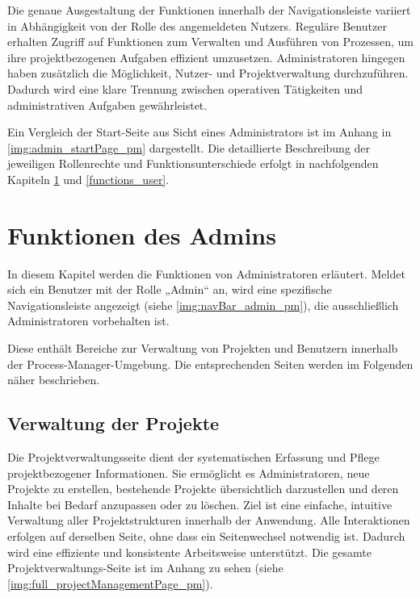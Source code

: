 
Die genaue Ausgestaltung der Funktionen innerhalb der Navigationsleiste variiert in Abhängigkeit von der Rolle des angemeldeten Nutzers. 
Reguläre Benutzer erhalten Zugriff auf Funktionen zum Verwalten und Ausführen von Prozessen, um ihre projektbezogenen Aufgaben effizient umzusetzen. Administratoren hingegen haben zusätzlich die Möglichkeit, Nutzer- und Projektverwaltung durchzuführen. Dadurch wird eine klare Trennung zwischen operativen Tätigkeiten und administrativen Aufgaben gewährleistet.

Ein Vergleich der Start-Seite aus Sicht eines Administrators ist im Anhang in \autoref{img:admin_startPage_pm} dargestellt. Die detaillierte Beschreibung der jeweiligen Rollenrechte und Funktionsunterschiede erfolgt in nachfolgenden Kapiteln \ref{functions_admin} und \ref{functions_user}.

\newpage
\section{Funktionen des Admins} \label{functions_admin}
In diesem Kapitel werden die Funktionen von Administratoren erläutert. Meldet sich ein Benutzer mit der Rolle „Admin“ an, wird eine spezifische Navigationsleiste angezeigt (siehe \autoref{img:navBar_admin_pm}), die ausschließlich Administratoren vorbehalten ist. 


Diese enthält Bereiche zur Verwaltung von Projekten und Benutzern innerhalb der Process-Manager-Umgebung. Die entsprechenden Seiten werden im Folgenden näher beschrieben.


\subsection{Verwaltung der Projekte}
Die Projektverwaltungsseite dient der systematischen Erfassung und Pflege projektbezogener Informationen. Sie ermöglicht es Administratoren, neue Projekte zu erstellen, bestehende Projekte übersichtlich darzustellen und deren Inhalte bei Bedarf anzupassen oder zu löschen. Ziel ist eine einfache, intuitive Verwaltung aller Projektstrukturen innerhalb der Anwendung. Alle Interaktionen erfolgen auf derselben Seite, ohne dass ein Seitenwechsel notwendig ist. Dadurch wird eine effiziente und konsistente Arbeitsweise unterstützt. Die gesamte Projektverwaltungs-Seite ist im Anhang zu sehen (siehe \autoref{img:full_projectManagementPage_pm}).

